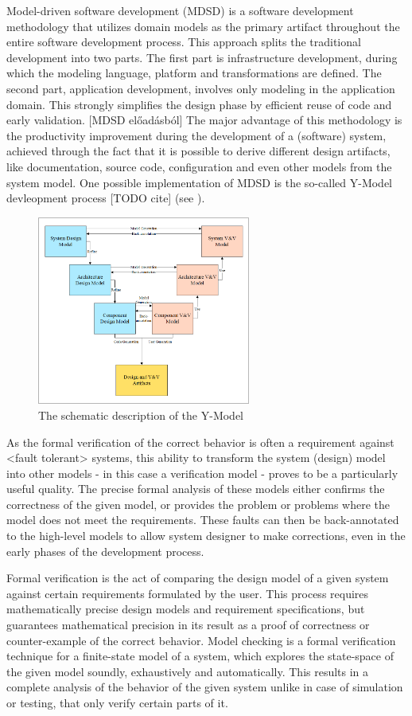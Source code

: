 Model-driven software development (MDSD) is a software development methodology that utilizes domain models as the primary artifact throughout the entire software development process. This approach splits the traditional development into two parts. The first part is infrastructure development, during which the modeling language, platform and transformations are defined. The second part, application development, involves only modeling in the application domain. This strongly simplifies the design phase by efficient reuse of code and early validation. [MDSD előadásból] The major advantage of this methodology is the productivity improvement during the development of a (software) system, achieved through the fact that it is possible to derive different design artifacts, like documentation, source code, configuration and even other models from the system model.  \cite{RoadToModelTransf} One possible implementation of MDSD is the so-called Y-Model devleopment process [TODO cite] (see ).
\begin{figure}[!ht]
	\centering
	\includegraphics[width=70mm, keepaspectratio]{figures/yModel.png}
	\caption{The schematic description of the Y-Model}
	\label{fig:yModel}
\end{figure}

As the formal verification of the correct behavior is often a requirement against <fault tolerant> systems, this ability to transform the system (design) model into other models - in this case a verification model - proves to be a particularly useful quality. The precise formal analysis of these models either confirms the correctness of the given model, or provides the problem or problems where the model does not meet the requirements. These faults can then be back-annotated to the high-level models to allow system designer to make corrections, even in the early phases of the development process. \cite{RoadToModelTransf}

Formal verification is the act of comparing the design model of a given system against certain requirements formulated by the user. This process requires mathematically precise design models and requirement specifications, but guarantees mathematical precision in its result as a proof of correctness or counter-example of the correct behavior.
Model checking \cite{ModelCheckingClarkeGrumberg} is a formal verification technique for a finite-state model of a system, which explores the state-space of the given model soundly, exhaustively and automatically. This results in a complete analysis of the behavior of the given system unlike in case of simulation or testing, that only verify certain parts of it.

